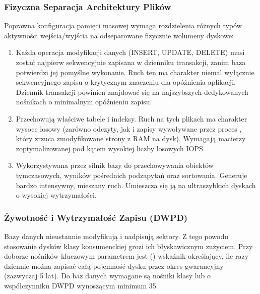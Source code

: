 \documentclass[letterpaper,10pt,polish]{sphinxmanual}
\begin{document}
\subsubsection{Fizyczna Separacja Architektury Plików}
\label{\detokenize{rozdzia_u0142_2/rozdzia_u0142_21/index:fizyczna-separacja-architektury-plikow}}
\sphinxAtStartPar
Poprawna konfiguracja pamięci masowej wymaga rozdzielenia różnych typów aktywności wejścia/wyjścia na odseparowane fizycznie wolumeny dyskowe:
\begin{enumerate}
%
\item {} 
\sphinxAtStartPar
{} Każda operacja modyfikacji danych (INSERT, UPDATE, DELETE) musi zostać najpierw sekwencyjnie zapisana w dzienniku transakcji, zanim baza potwierdzi jej pomyślne wykonanie. Ruch ten ma charakter niemal wyłącznie sekwencyjnego zapisu o krytycznym znaczeniu dla opóźnienia aplikacji. Dziennik transakcji powinien znajdować się na najszybszych dedykowanych nośnikach o minimalnym opóźnieniu zapisu.

\item {} 
\sphinxAtStartPar
{} Przechowują właściwe tabele i indeksy. Ruch na tych plikach ma charakter wysoce losowy (zarówno odczyty, jak i zapisy wywoływane przez proces , który zrzuca zmodyfikowane strony z RAM na dysk). Wymagają macierzy zoptymalizowanej pod kątem wysokiej liczby losowych IOPS.

\item {} 
\sphinxAtStartPar
{} Wykorzystywana przez silnik bazy do przechowywania obiektów tymczasowych, wyników pośrednich podzapytań oraz sortowania. Generuje bardzo intensywny, mieszany ruch. Umieszcza się ją na ultra\sphinxhyphen{}szybkich dyskach o wysokiej wytrzymałości.

\end{enumerate}


\subsubsection{Żywotność i Wytrzymałość Zapisu (DWPD)}
\label{\detokenize{rozdzia_u0142_2/rozdzia_u0142_21/index:zywotnosc-i-wytrzymalosc-zapisu-dwpd}}
\sphinxAtStartPar
Bazy danych nieustannie modyfikują i nadpisują sektory. Z tego powodu stosowanie dysków klasy konsumenckiej grozi ich błyskawicznym zużyciem. Przy doborze nośników kluczowym parametrem jest  () \textendash{} wskaźnik określający, ile razy dziennie można zapisać całą pojemność dysku przez okres gwarancyjny (zazwyczaj 5 lat). Do baz danych wymagane są nośniki klasy  lub  o współczynniku DWPD wynoszącym minimum 3\sphinxhyphen{}5.
\end{document}
